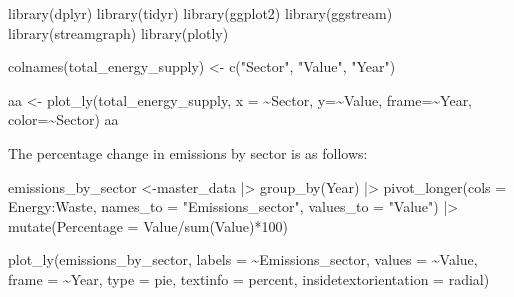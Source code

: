 \documentclass[
  letterpaper,
  DIV=11,
  numbers=noendperiod]{scrartcl}
\newenvironment{Shaded}{\begin{snugshade}}{\end{snugshade}}
\newcommand{\AttributeTok}[1]{\textcolor[rgb]{0.40,0.45,0.13}{#1}}
\newcommand{\DecValTok}[1]{\textcolor[rgb]{0.68,0.00,0.00}{#1}}
\newcommand{\FunctionTok}[1]{\textcolor[rgb]{0.28,0.35,0.67}{#1}}
\newcommand{\NormalTok}[1]{\textcolor[rgb]{0.00,0.23,0.31}{#1}}
\newcommand{\OtherTok}[1]{\textcolor[rgb]{0.00,0.23,0.31}{#1}}
\newcommand{\SpecialCharTok}[1]{\textcolor[rgb]{0.37,0.37,0.37}{#1}}
\newcommand{\StringTok}[1]{\textcolor[rgb]{0.13,0.47,0.30}{#1}}
\begin{document}
\begin{Shaded}
\begin{Highlighting}[]
\FunctionTok{library}\NormalTok{(dplyr)}
\FunctionTok{library}\NormalTok{(tidyr)}
\FunctionTok{library}\NormalTok{(ggplot2)}
\FunctionTok{library}\NormalTok{(ggstream)}
\FunctionTok{library}\NormalTok{(streamgraph)}
\FunctionTok{library}\NormalTok{(plotly)}


\FunctionTok{colnames}\NormalTok{(total\_energy\_supply) }\OtherTok{\textless{}{-}} \FunctionTok{c}\NormalTok{(}\StringTok{"Sector"}\NormalTok{, }\StringTok{"Value"}\NormalTok{, }\StringTok{"Year"}\NormalTok{)}

\NormalTok{aa }\OtherTok{\textless{}{-}} \FunctionTok{plot\_ly}\NormalTok{(total\_energy\_supply, }\AttributeTok{x =} \SpecialCharTok{\textasciitilde{}}\NormalTok{Sector, }\AttributeTok{y=}\SpecialCharTok{\textasciitilde{}}\NormalTok{Value, }\AttributeTok{frame=}\SpecialCharTok{\textasciitilde{}}\NormalTok{Year, }\AttributeTok{color=}\SpecialCharTok{\textasciitilde{}}\NormalTok{Sector)}
\NormalTok{aa}
\end{Highlighting}
\end{Shaded}

The percentage change in emissions by sector is as follows:

\begin{Shaded}
\begin{Highlighting}[]
\NormalTok{emissions\_by\_sector }\OtherTok{\textless{}{-}}\NormalTok{master\_data }\SpecialCharTok{|\textgreater{}} \FunctionTok{group\_by}\NormalTok{(Year) }\SpecialCharTok{|\textgreater{}} \FunctionTok{pivot\_longer}\NormalTok{(}\AttributeTok{cols =}\NormalTok{ Energy}\SpecialCharTok{:}\NormalTok{Waste,}
                            \AttributeTok{names\_to =} \StringTok{"Emissions\_sector"}\NormalTok{,}
                            \AttributeTok{values\_to =} \StringTok{"Value"}\NormalTok{) }\SpecialCharTok{|\textgreater{}} \FunctionTok{mutate}\NormalTok{(}\AttributeTok{Percentage =}\NormalTok{ Value}\SpecialCharTok{/}\FunctionTok{sum}\NormalTok{(Value)}\SpecialCharTok{*}\DecValTok{100}\NormalTok{)}

\FunctionTok{plot\_ly}\NormalTok{(emissions\_by\_sector,}
        \AttributeTok{labels =} \SpecialCharTok{\textasciitilde{}}\NormalTok{Emissions\_sector,}
        \AttributeTok{values =} \SpecialCharTok{\textasciitilde{}}\NormalTok{Value,}
        \AttributeTok{frame =} \SpecialCharTok{\textasciitilde{}}\NormalTok{Year,}
        \AttributeTok{type =} \StringTok{\textquotesingle{}pie\textquotesingle{}}\NormalTok{,}
        \AttributeTok{textinfo =} \StringTok{\textquotesingle{}percent\textquotesingle{}}\NormalTok{,}
        \AttributeTok{insidetextorientation =} \StringTok{\textquotesingle{}radial\textquotesingle{}}\NormalTok{) }
\end{Highlighting}
\end{Shaded}
\end{document}
